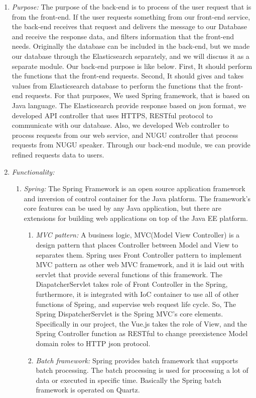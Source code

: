 \documentclass[conference]{IEEEtran}
\begin{document}
\vspace{30mm}
\begin{enumerate} 
  \item \textit{Purpose: } The purpose of the back-end is to process of the user request that is from the front-end. If the user requests something from our front-end service, the back-end receives that request and delivers the message to our Database and receive the response data, and filters information that the front-end needs. Originally the database can be included in the back-end, but we made our database through the Elasticsearch separately, and we will discuss it as a separate module.
Our back-end purpose is like below. First, It should perform the functions that the front-end requests. Second, It should gives and takes values from Elasticsearch database to perform the functions that the front-end requests.
For that purposes, We used Spring framework, that is based on Java language. The Elasticsearch provide response based on json format, we developed API controller that uses HTTPS, RESTful protocol to communicate with our database. Also, we developed Web controller to process requests from our web service, and NUGU controller that process requests from NUGU speaker. Through our back-end module, we can provide refined requests data to users.\\
  \item \textit{Functionality: } 	
  	 \begin{enumerate}

	\item \textit {Spring: }   The Spring Framework is an open source application framework and inversion of control container for the Java platform. The framework's core features can be used by any Java application, but there are extensions for building web applications on top of the Java EE platform.
	 \begin{enumerate}
	\item \textit {MVC pattern:} A business logic, MVC(Model View Controller) is a design pattern that places Controller between Model and View to separates them. Spring uses Front Controller pattern to implement MVC pattern as other web MVC framework, and it is laid out with servlet that provide several functions of this framework. The DiapatcherServlet takes role of Front Controller in the Spring, furthermore, it is integrated with IoC container to use all of other functions of Spring, and supervise web request life cycle. So, The Spring DispatcherServlet is the Spring MVC’s core elements. Specifically in our project, the Vue.js takes the role of View, and the Spring Controller function as RESTful to change preexistence Model domain roles to HTTP json protocol.
	\item \textit {Batch framework:} Spring provides batch framework that supports batch processing. The batch processing is used for processing a lot of data or executed in specific time. Basically the Spring batch framework is operated on Quartz.
	  \end{enumerate}
	  

\end{enumerate}
\end{enumerate}
\end{document}
